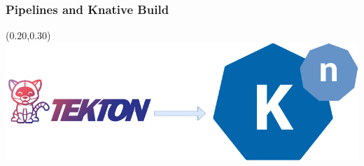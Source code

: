 \documentclass[aspectratio=169,11pt,hyperref={colorlinks=true}]{beamer}
\begin{document}
\begin{lblackrwhiteframe}
\begin{blackframe}
\begin{grayframe}
  \frametitle{Pipelines and Knative Build}
  \begin{textblock*}{0.5\paperwidth}(0.20\paperwidth,0.30\paperheight)
    \centering
    \includegraphics[width=0.6\paperwidth]{img/knative+tekton.png}
  \end{textblock*}
\end{grayframe}


\end{blackframe}
\end{lblackrwhiteframe}
\end{document}
